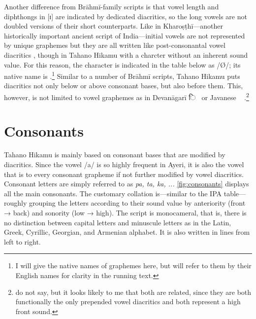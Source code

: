 Another difference from Brāhmī-family scripts is that vowel length and 
diphthongs in [ɪ] are indicated by dedicated diacritics, so the long vowels 
are not doubled versions of their short counterparts. Like in 
Kharoṣṭhī---another historically important ancient script of India---initial 
vowels are not represented by unique graphemes but they are all written like 
post-consonantal vowel diacritics \citep[377]{salomon1996}, though in Tahano 
Hikamu with a charcter without an inherent sound value. For this reason, 
the character is indicated in the table below as  /Ø/; its native name 
is .\footnote{I will give the native names of 
graphemes here, but will refer to them by their English names for clarity in 
the running text.} Similar to a number of Brāhmī scripts, Tahano Hikamu puts 
diacritics not only below or above consonant bases, but also before them. This, 
however, is not limited to vowel graphemes as in Devanāgarī {\FS ि}~ or 
Javanese ~ 
\citep[478]{kuipersmcdermott1996}.\footnote{\citet{kuipersmcdermott1996} do not 
say, but it looks likely to me that both are related, since they are both 
functionally the only prepended vowel diacritics and both represent a high front 
sound.}

\section{Consonants}

Tahano Hikamu is mainly based on consonant bases that are modified by 
diacritics. Since the vowel /a/ is so highly frequent in Ayeri, it is also the 
vowel that is  to every consonant grapheme if not further modified 
by vowel diacritics. Consonant letters are simply referred to as \textit{pa, ta, 
ka, ...} \autoref{fig:consonants} displays all the main consonants. The 
customary collation is---similar to the IPA table---roughly grouping the letters 
according to their sound value by anteriority (front → back) and sonority (low → 
high). The script is monocameral, that is, there is no distinction between 
capital letters and minuscule letters as in the Latin, Greek, Cyrillic, 
Georgian, and Armenian alphabet. It is also written in lines from left to right.


